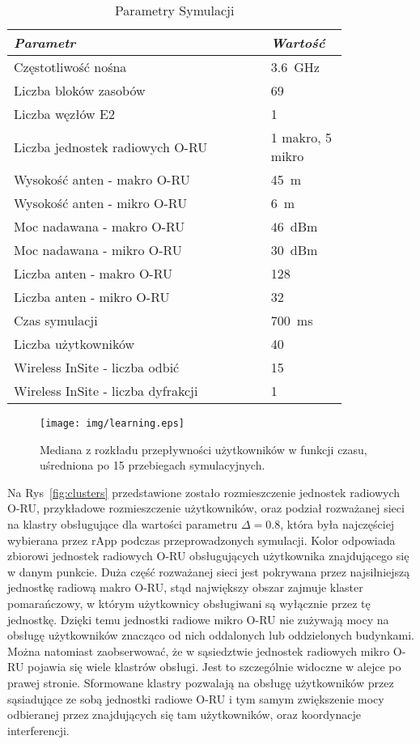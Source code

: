 \documentclass[a4paper]{article}
\begin{document}
\begin{multicols}{2}
\begin{table}[H]
\centering
\caption{Parametry Symulacji}
\label{tab1}
\medskip
\begin{tabularx}{1.0\columnwidth}{p{0.65\linewidth} p{0.17\linewidth} }
\toprule
\textit{Parametr} & \textit{Wartość}\\ \midrule
Częstotliwość nośna		& 3.6~GHz \\ \hline
Liczba bloków zasobów & 69 \\ \hline
Liczba węzłów E2 & 1 \\ \hline
Liczba jednostek radiowych O-RU & 1 makro, 5 mikro \\ \hline
Wysokość anten - makro O-RU & 45~m\\ \hline
Wysokość anten - mikro O-RU & 6~m\\ \hline
Moc nadawana - makro O-RU & $46$~dBm \\ \hline
Moc nadawana - mikro O-RU & $30$~dBm \\ \hline
Liczba anten - makro O-RU & 128\\ \hline
Liczba anten - mikro O-RU & 32 \\ \hline
Czas symulacji & 700~ms \\ \hline
Liczba użytkowników & 40 \\ \hline
Wireless InSite - liczba odbić & 15 \\ \hline
Wireless InSite - liczba dyfrakcji & 1\\\bottomrule
\end{tabularx}
\end{table}
\begin{figure}[H]
\centering
\texttt{[image: img/learning.eps]}
\caption{Mediana z rozkładu przepływności użytkowników w funkcji czasu, uśredniona po 15 przebiegach symulacyjnych.}
\label{fig:learning}
\end{figure}
Na Rys~\ref{fig:clusters} przedstawione zostało rozmieszczenie jednostek radiowych O-RU, przykładowe rozmieszczenie użytkowników, oraz podział rozważanej sieci na klastry obsługujące dla wartości parametru $\Delta=0.8$, która była najczęściej wybierana przez rApp podczas przeprowadzonych symulacji. Kolor odpowiada zbiorowi jednostek radiowych O-RU obsługujących użytkownika znajdującego się w danym punkcie. Duża część rozważanej sieci jest pokrywana przez najsilniejszą jednostkę radiową makro O-RU, stąd największy obszar zajmuje klaster pomarańczowy, w którym użytkownicy obsługiwani są wyłącznie przez tę jednostkę. Dzięki temu jednostki radiowe mikro O-RU nie zużywają mocy na obsługę użytkowników znacząco od nich oddalonych lub oddzielonych budynkami. Można natomiast zaobserwować, że w sąsiedztwie jednostek radiowych mikro O-RU pojawia się wiele klastrów obsługi. Jest to szczególnie widoczne w alejce po prawej stronie. Sformowane klastry pozwalają na obsługę użytkowników przez sąsiadujące ze sobą jednostki radiowe O-RU i tym samym zwiększenie mocy odbieranej przez znajdujących się tam użytkowników, oraz koordynacje interferencji.

\end{multicols}
\end{document}
